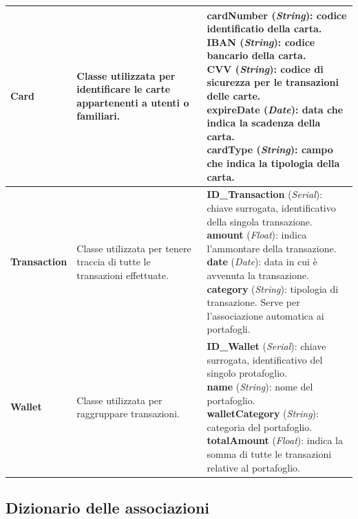 \begin{longtable}{m{2.7cm}|m{4cm}|m{7cm}}
    \textbf{Card} & \raggedright Classe utilizzata per identificare le carte appartenenti a utenti o familiari. &
    \parbox{7cm}{
        \textbf{cardNumber} (\textit{String}): codice identificatio della carta. \\
        \textbf{IBAN} (\textit{String}): codice bancario della carta. \\
        \textbf{CVV} (\textit{String}): codice di sicurezza per le transazioni delle carte. \\
        \textbf{expireDate} (\textit{Date}): data che indica la scadenza della carta. \\
        \textbf{cardType} (\textit{String}): campo che indica la tipologia della carta.
    } \\ \hline

    \textbf{Transaction} & \raggedright Classe utilizzata per tenere traccia di tutte le transazioni effettuate. &
    \parbox{7cm}{
        \textbf{ID\_Transaction} (\textit{Serial}): chiave surrogata, identificativo della singola transazione. \\
        \textbf{amount} (\textit{Float}): indica l'ammontare della transazione. \\
        \textbf{date} (\textit{Date}): data in cui è avvenuta la transazione. \\
        \textbf{category} (\textit{String}): tipologia di transazione. Serve per l'associazione automatica ai portafogli.
    } \\ \hline

    \textbf{Wallet} & \raggedright Classe utilizzata per raggruppare transazioni. &
    \parbox{7cm}{
        \textbf{ID\_Wallet} (\textit{Serial}): chiave surrogata, identificativo del singolo protafoglio. \\
        \textbf{name} (\textit{String}): nome del portafoglio. \\
        \textbf{walletCategory} (\textit{String}): categoria del portafoglio. \\
        \textbf{totalAmount} (\textit{Float}): indica la somma di tutte le transazioni relative al portafoglio.
    } \\ \hline

\end{longtable}

\subsection{Dizionario delle associazioni}

